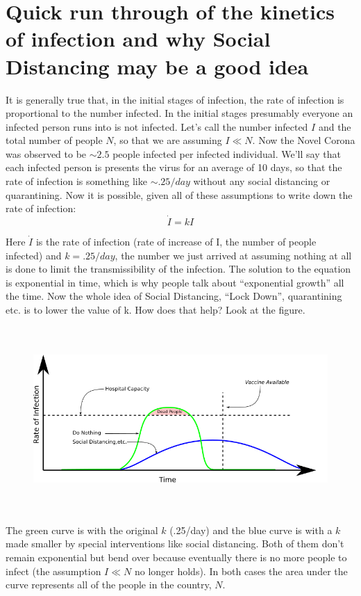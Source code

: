 \documentclass{article}
\begin{document}
\section{Quick run through of the kinetics of infection and why Social Distancing may be a good idea}

It is generally true that, in the initial stages of infection, the
rate of infection is proportional to the number infected.  In the
initial stages presumably everyone an infected person runs into is not
infected.  Let's call the number infected $I$ and the total number of
people $N$, so that we are assuming $I \ll N$.  Now the Novel Corona
was observed to be $\sim 2.5$ people infected per infected individual.
We'll say that each infected person is presents the virus for an
average of 10 days, so that the rate of infection is something like
$\sim .25/day$ without any social distancing or quarantining.  Now it is possible, given all of these assumptions to write down the rate of infection:
\begin{equation}
  \dot{I} = kI
\end{equation}

Here $\dot{I}$ is the rate of infection (rate of increase of I, the
number of people infected) and $k = .25/day$, the number we just
arrived at assuming nothing at all is done to limit the
transmissibility of the infection.  The solution to the equation is
exponential in time, which is why people talk about ``exponential
growth'' all the time.  Now the whole idea of Social Distancing, ``Lock Down'', quarantining etc. is to lower the value of k.  How does that help?  Look at the figure.

\begin{figure}[ht]
\centering
\includegraphics[height=7cm]{graphics/corona.png}
\end{figure}

The green curve is with the original $k$ (.25/day) and the blue curve
is with a $k$ made smaller by special interventions like social
distancing.  Both of them don't remain exponential but bend over
because eventually there is no more people to infect (the assumption
$I \ll N$ no longer holds).  In both cases the area under the curve
represents all of the people in the country, $N$.
\end{document}
